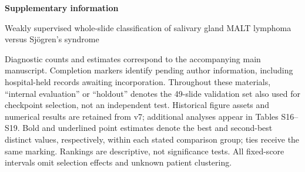 \documentclass[11pt,a4paper]{article}
\begin{document}
\begin{center}\end{center}\medskip
{\Large\bfseries Supplementary information\par}
\medskip
{\large Weakly supervised whole-slide classification of salivary
gland MALT lymphoma versus Sjögren's syndrome\par}
\medskip
Diagnostic counts and estimates correspond to the accompanying main manuscript.
Completion markers identify pending author information, including hospital-held
records awaiting incorporation. Throughout these materials, ``internal evaluation'' or ``holdout'' denotes the 49-slide validation set also used for checkpoint selection, not an independent test. Historical figure assets and numerical results are retained from v7; additional analyses appear in Tables S16--S19. Bold and underlined point estimates denote the best and second-best distinct values, respectively, within each stated comparison group; ties receive the same marking. Rankings are descriptive, not significance tests. All fixed-score intervals omit selection effects and unknown patient clustering.


\clearpage

\clearpage


\clearpage
\begingroup\small


\endgroup
\end{document}
